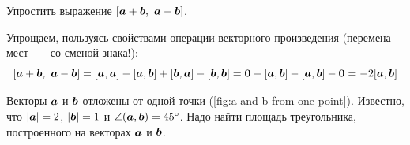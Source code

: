 \documentclass[a4paper,12pt]{article}
\begin{document}
  
  \begin{problem}[3.2(1)]
    Упростить выражение $[\bds a + \bds b,\ \bds a - \bds b]$.
  \end{problem}
  
  \begin{solution}
    Упрощаем, пользуясь свойствами операции векторного произведения (перемена мест~---~со сменой знака!):
    \[
      [\boldsymbol a + \boldsymbol b,\ \boldsymbol a - \boldsymbol b] = [\boldsymbol a, \boldsymbol a] - [\boldsymbol a, \boldsymbol b] + [\boldsymbol b, \boldsymbol a] - [\boldsymbol b, \boldsymbol b]
        = \boldsymbol 0 - [\boldsymbol a, \boldsymbol b] - [\boldsymbol a, \boldsymbol b] - \boldsymbol 0
        = -2 [\boldsymbol a, \boldsymbol b]
    \]
  \end{solution}
  
  
  \begin{problem}[``Как 3.8(1)'']
    Векторы $\boldsymbol a$ и $\boldsymbol b$ отложены от одной точки (\ref{fig:a-and-b-from-one-point}).
    Известно, что $|\bds a| \hm= 2$, $|\bds b| \hm= 1$ и $\angle{(\bds a, \bds b)} \hm= 45\degree$.
    Надо найти площадь треугольника, построенного на векторах $\boldsymbol a$ и $\boldsymbol b$.
  \end{problem}
  
\end{document}
